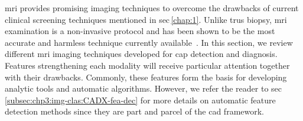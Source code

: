 \Ac{mri} provides promising imaging techniques to overcome the drawbacks of
current clinical screening techniques mentioned in \acs{sec}\,\ref{chap:1}.
Unlike \ac{trus} biopsy, \ac{mri} examination is a non-invasive protocol and
has been shown to be the most accurate and harmless technique currently
available~\cite{Turkbey2012}.
In this section, we review different \ac{mri} imaging techniques developed for
\ac{cap} detection and diagnosis.
Features strengthening each modality will receive particular attention together
with their drawbacks.
Commonly, these features form the basis for developing analytic tools and
automatic algorithms.
However, we refer the reader to
\acs{sec}\,\ref{subsec:chp3:img-clas:CADX-fea-dec} for more details on
automatic feature detection methods since they are part and parcel of the
\acs{cad} framework.

